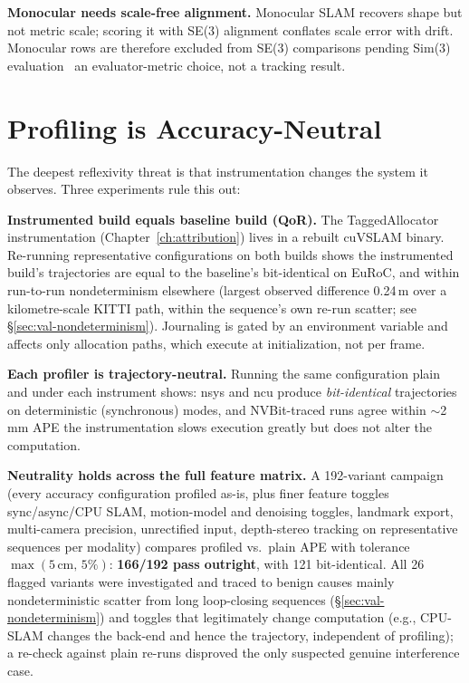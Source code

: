 \textbf{Monocular needs scale-free alignment.} Monocular SLAM recovers shape but not metric scale; scoring it with SE(3) alignment conflates scale error with drift. Monocular rows are therefore excluded from SE(3) comparisons pending Sim(3) evaluation~\cite{umeyama1991} an evaluator-metric choice, not a tracking result.

\section{Profiling is Accuracy-Neutral}
\label{sec:val-neutrality}

The deepest reflexivity threat is that instrumentation changes the system it observes. Three experiments rule this out:

\textbf{Instrumented build equals baseline build (QoR).} The TaggedAllocator instrumentation (Chapter~\ref{ch:attribution}) lives in a rebuilt cuVSLAM binary. Re-running representative configurations on both builds shows the instrumented build's trajectories are equal to the baseline's bit-identical on EuRoC, and within run-to-run nondeterminism elsewhere (largest observed difference 0.24\,m over a kilometre-scale KITTI path, within the sequence's own re-run scatter; see \S\ref{sec:val-nondeterminism}). Journaling is gated by an environment variable and affects only allocation paths, which execute at initialization, not per frame.

\textbf{Each profiler is trajectory-neutral.} Running the same configuration plain and under each instrument shows: nsys and ncu produce \emph{bit-identical} trajectories on deterministic (synchronous) modes, and NVBit-traced runs agree within $\sim$2\,mm APE the instrumentation slows execution greatly but does not alter the computation.

\textbf{Neutrality holds across the full feature matrix.} A 192-variant campaign (every accuracy configuration profiled as-is, plus finer feature toggles sync/async/CPU SLAM, motion-model and denoising toggles, landmark export, multi-camera precision, unrectified input, depth-stereo tracking on representative sequences per modality) compares profiled vs.\ plain APE with tolerance $\max(5\,\text{cm},\,5\%)$: \textbf{166/192 pass outright}, with 121 bit-identical. All 26 flagged variants were investigated and traced to benign causes mainly nondeterministic scatter from long loop-closing sequences (\S\ref{sec:val-nondeterminism}) and toggles that legitimately change computation (e.g., CPU-SLAM changes the back-end and hence the trajectory, independent of profiling); a re-check against plain re-runs disproved the only suspected genuine interference case.

